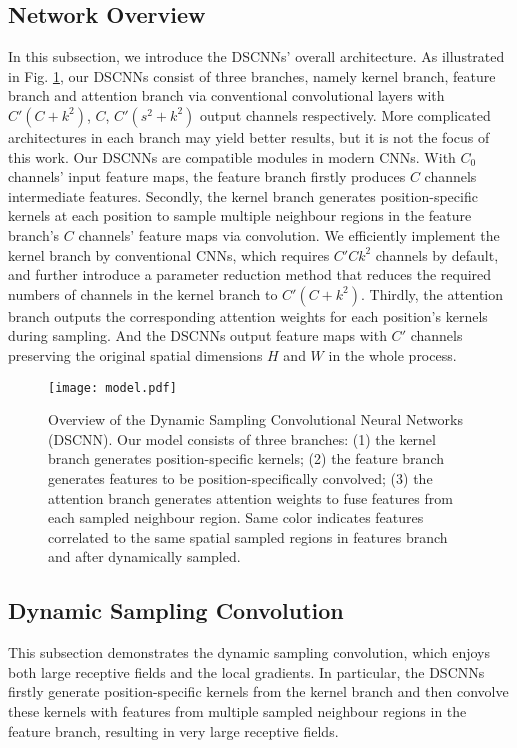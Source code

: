 \documentclass[runningheads]{llncs}
\begin{document}
\subsection{Network Overview}
\label{sec:3.1}
In this subsection, we introduce the DSCNNs' overall architecture. As illustrated in Fig. \ref{fig:network_structure}, our DSCNNs consist of three branches, namely kernel branch, feature branch and attention branch via conventional convolutional layers with $C'(C+k^2)$, $C$, $C'(s^2+k^2)$ output channels respectively. More complicated architectures in each branch may yield better results, but it is not the focus of this work. Our DSCNNs are compatible modules in modern CNNs. With $C_0$ channels' input feature maps, the feature branch firstly produces $C$ channels intermediate features. Secondly, the kernel branch generates position-specific kernels at each position to sample multiple neighbour regions in the feature branch's $C$ channels' feature maps via convolution. We efficiently implement the kernel branch by conventional CNNs, which requires $C'Ck^2$ channels by default, and further introduce a parameter reduction method that reduces the required numbers of channels in the kernel branch to $C'(C+k^2)$. Thirdly, the attention branch outputs the corresponding attention weights for each position's kernels during sampling. And the DSCNNs output feature maps with $C'$ channels preserving the original spatial dimensions $H$ and $W$ in the whole process.

\begin{figure}[!t]
\centering
\texttt{[image: model.pdf]}
\caption{Overview of the Dynamic Sampling Convolutional Neural Networks (DSCNN). 
Our model consists of three branches: (1) the kernel branch generates position-specific kernels;
(2) the feature branch generates features to be position-specifically convolved;
(3) the attention branch generates attention weights to fuse features from each sampled neighbour region. Same color indicates features correlated to the same spatial sampled regions in features branch and after dynamically sampled. }
\label{fig:network_structure}
\end{figure}

\subsection{Dynamic Sampling Convolution}
\label{sec:3.2}
This subsection demonstrates the dynamic sampling convolution, which enjoys both large receptive fields and the local gradients. In particular, the DSCNNs firstly generate position-specific kernels from the kernel branch and then convolve these kernels with features from multiple sampled neighbour regions in the feature branch, resulting in very large receptive fields. 
\end{document}
